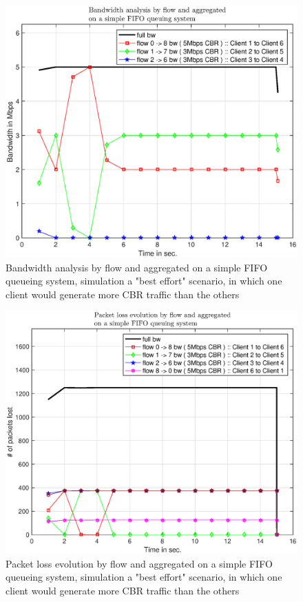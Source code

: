 \documentclass[conference,compsoc]{IEEEtran}
\begin{document}
  \begin{figure}[H]
    \centering
    \includegraphics[width=1\columnwidth]{EPS/A/bw_a3.eps}
    \caption{Bandwidth analysis by flow and aggregated on a simple FIFO queueing system, simulation a "best effort" scenario,  in which one client would generate more CBR traffic than
the others}
    \label{graph:bw_a3}
    \end{figure}
    
    
    \begin{figure}[H]
    \centering
    \includegraphics[width=1\columnwidth]{EPS/A/loss_a3.eps}
    \caption{Packet loss evolution by flow and aggregated on a simple FIFO queueing system, simulation a "best effort" scenario,  in which one client would generate more CBR traffic than
the others}\label{graph:loss_a3}
    \end{figure}
    
\end{document}
